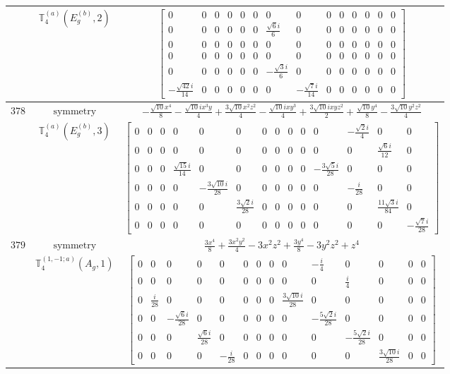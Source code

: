 \documentclass[fleqn,8pt,landscape]{jsarticle}
\begin{document}
\begin{longtable}{ccc}
$  $ & $ \mathbb{T}_{4}^{(a)}(E_{g}^{(b)},2) $ & $ \begin{bmatrix} 0 & 0 & 0 & 0 & 0 & 0 & 0 & 0 & 0 & 0 & 0 & 0 & 0 & 0 \\ 0 & 0 & 0 & 0 & 0 & 0 & \frac{\sqrt{6} i}{6} & 0 & 0 & 0 & 0 & 0 & 0 & 0 \\ 0 & 0 & 0 & 0 & 0 & 0 & 0 & 0 & 0 & 0 & 0 & 0 & 0 & 0 \\ 0 & 0 & 0 & 0 & 0 & 0 & 0 & 0 & 0 & 0 & 0 & 0 & 0 & 0 \\ 0 & 0 & 0 & 0 & 0 & 0 & - \frac{\sqrt{3} i}{6} & 0 & 0 & 0 & 0 & 0 & 0 & 0 \\ - \frac{\sqrt{42} i}{14} & 0 & 0 & 0 & 0 & 0 & 0 & - \frac{\sqrt{7} i}{14} & 0 & 0 & 0 & 0 & 0 & 0 \end{bmatrix} $ \\ \hline
$ 378 $ & $ \text{symmetry} $ & $ - \frac{\sqrt{10} x^{4}}{8} - \frac{\sqrt{10} i x^{3} y}{4} + \frac{3 \sqrt{10} x^{2} z^{2}}{4} - \frac{\sqrt{10} i x y^{3}}{4} + \frac{3 \sqrt{10} i x y z^{2}}{2} + \frac{\sqrt{10} y^{4}}{8} - \frac{3 \sqrt{10} y^{2} z^{2}}{4} $ \\
$  $ & $ \mathbb{T}_{4}^{(a)}(E_{g}^{(b)},3) $ & $ \begin{bmatrix} 0 & 0 & 0 & 0 & 0 & 0 & 0 & 0 & 0 & 0 & 0 & - \frac{\sqrt{2} i}{4} & 0 & 0 \\ 0 & 0 & 0 & 0 & 0 & 0 & 0 & 0 & 0 & 0 & 0 & 0 & \frac{\sqrt{6} i}{12} & 0 \\ 0 & 0 & 0 & \frac{\sqrt{15} i}{14} & 0 & 0 & 0 & 0 & 0 & 0 & - \frac{3 \sqrt{5} i}{28} & 0 & 0 & 0 \\ 0 & 0 & 0 & 0 & - \frac{3 \sqrt{10} i}{28} & 0 & 0 & 0 & 0 & 0 & 0 & - \frac{i}{28} & 0 & 0 \\ 0 & 0 & 0 & 0 & 0 & \frac{3 \sqrt{2} i}{28} & 0 & 0 & 0 & 0 & 0 & 0 & \frac{11 \sqrt{3} i}{84} & 0 \\ 0 & 0 & 0 & 0 & 0 & 0 & 0 & 0 & 0 & 0 & 0 & 0 & 0 & - \frac{\sqrt{7} i}{28} \end{bmatrix} $ \\ \hline
$ 379 $ & $ \text{symmetry} $ & $ \frac{3 x^{4}}{8} + \frac{3 x^{2} y^{2}}{4} - 3 x^{2} z^{2} + \frac{3 y^{4}}{8} - 3 y^{2} z^{2} + z^{4} $ \\
$  $ & $ \mathbb{T}_{4}^{(1,-1;a)}(A_{g},1) $ & $ \begin{bmatrix} 0 & 0 & 0 & 0 & 0 & 0 & 0 & 0 & 0 & - \frac{i}{4} & 0 & 0 & 0 & 0 \\ 0 & 0 & 0 & 0 & 0 & 0 & 0 & 0 & 0 & 0 & \frac{i}{4} & 0 & 0 & 0 \\ 0 & \frac{i}{28} & 0 & 0 & 0 & 0 & 0 & 0 & \frac{3 \sqrt{10} i}{28} & 0 & 0 & 0 & 0 & 0 \\ 0 & 0 & - \frac{\sqrt{6} i}{28} & 0 & 0 & 0 & 0 & 0 & 0 & - \frac{5 \sqrt{2} i}{28} & 0 & 0 & 0 & 0 \\ 0 & 0 & 0 & \frac{\sqrt{6} i}{28} & 0 & 0 & 0 & 0 & 0 & 0 & - \frac{5 \sqrt{2} i}{28} & 0 & 0 & 0 \\ 0 & 0 & 0 & 0 & - \frac{i}{28} & 0 & 0 & 0 & 0 & 0 & 0 & \frac{3 \sqrt{10} i}{28} & 0 & 0 \end{bmatrix} $ \\ \hline

\end{longtable}
\end{document}
